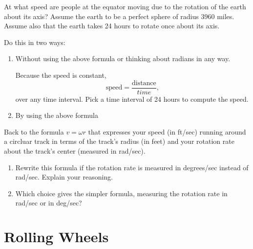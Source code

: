 \documentclass{ximera}
\begin{document}
\begin{question}  \label{Q255: Angles}
At what speed are people at the equator moving due to the rotation of the earth about its axis? Assume the earth to be a perfect sphere of radius $3960$ miles. Assume also that the earth takes 24 hours to rotate once about its axis.

Do this in two ways:

\begin{enumerate}
\item Without using the above formula or thinking about radians in any way.

\begin{hint}
Because the speed is constant, %
\[
     \text{speed} = \frac{\text{distance}}{{time}} ,
\]
over any time interval. Pick a time interval of 24 hours to compute the speed.
\end{hint}

\item By using the above formula

\end{enumerate}
\end{question}

\begin{question}  \label{Q2455: Angles}
Back to the formula $v=\omega r$ that expresses your speed (in ft/sec) running around a circluar track in terms of the track's radius (in feet) and your rotation rate about the track's center (measured in rad/sec).

\begin{enumerate}
\item Rewrite this formula if the rotation rate is measured in degrees/sec instead of rad/sec. Explain your reasoning.

\item Which choice gives the simpler formula, measuring the rotation rate in rad/sec or in deg/sec?
\end{enumerate}
\end{question}




\section{Rolling Wheels}
\end{document}
